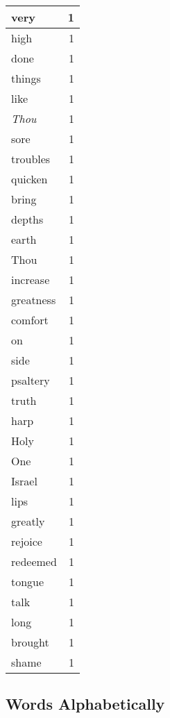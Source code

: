 \begin{center}
\begin{longtable}{l|r}
very & 1 \\ \hline
high & 1 \\ \hline
done & 1 \\ \hline
things & 1 \\ \hline
like & 1 \\ \hline
\emph{Thou} & 1 \\ \hline
sore & 1 \\ \hline
troubles & 1 \\ \hline
quicken & 1 \\ \hline
bring & 1 \\ \hline
depths & 1 \\ \hline
earth & 1 \\ \hline
Thou & 1 \\ \hline
increase & 1 \\ \hline
greatness & 1 \\ \hline
comfort & 1 \\ \hline
on & 1 \\ \hline
side & 1 \\ \hline
psaltery & 1 \\ \hline
truth & 1 \\ \hline
harp & 1 \\ \hline
Holy & 1 \\ \hline
One & 1 \\ \hline
Israel & 1 \\ \hline
lips & 1 \\ \hline
greatly & 1 \\ \hline
rejoice & 1 \\ \hline
redeemed & 1 \\ \hline
tongue & 1 \\ \hline
talk & 1 \\ \hline
long & 1 \\ \hline
brought & 1 \\ \hline
shame & 1 \\ \hline
\end{longtable}
\end{center}



\normalsize



\subsection{Words Alphabetically}

